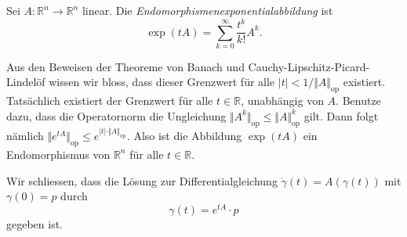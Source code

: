 \documentclass[../main.tex]{subfiles}
\begin{document}
\begin{definition}
  Sei $A \colon \mathbb{R}^n \to \mathbb{R}^n$ linear.
  Die \emph{Endomorphismenexponentialabbildung} ist
  \[
    \exp(tA) = \sum_{k=0}^{\infty} \frac{t^k}{k!} A^k.
  \]
\end{definition}

\begin{remark}
  Aus den Beweisen der Theoreme von Banach
  und Cauchy-Lipschitz-Picard-Lindelöf wissen wir bloss,
  dass dieser Grenzwert für alle $|t| < 1/\Vert A \Vert_{\text{op}}$ 
  existiert. Tatsächlich existiert der Grenzwert für alle
  $t \in \mathbb{R}$, unabhängig von $A$.
  Benutze dazu, dass die Operatornorm die Ungleichung
  $\Vert A^k \Vert_{\text{op}} \leq \Vert A \Vert_{\text{op}}^k$ 
  gilt. Dann folgt nämlich
  $\Vert e^{tA} \Vert_{\text{op}} \leq e^{|t| \cdot \Vert A \Vert_{\text{op}}}$.
  Also ist die Abbildung $\exp(tA)$ ein Endomorphismus von $\mathbb{R}^n$ 
  für alle $t \in \mathbb{R}$.
\end{remark}

Wir schliessen, dass die Lösung zur Differentialgleichung
$\dot \gamma(t) = A(\gamma(t))$ mit $\gamma(0) = p$ 
durch
\[
  \gamma(t) = e^{tA} \cdot p
\]
gegeben ist.
\end{document}

